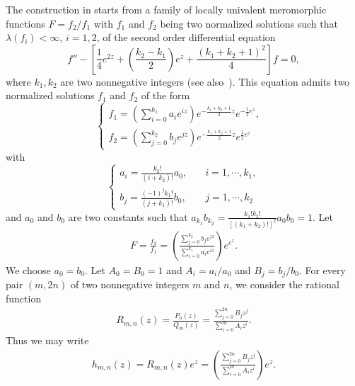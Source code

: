 \documentclass[12pt]{amsart}
\numberwithin{equation}{section}
\begin{document}
The construction in \cite{Zhang2024} starts from a family of locally univalent meromorphic functions $F=f_2/f_1$ with $f_1$ and $f_2$ being two normalized solutions such that $\lambda(f_i)<\infty$, $i=1,2$, of the second order differential equation
\begin{equation*}%
f''-\left[\frac{1}{4}e^{2z}+\left(\frac{k_2-k_1}{2}\right)e^{z}+\frac{(k_1+k_2+1)^2}{4}\right]f=0,
\end{equation*}
where $k_1,k_2$ are two nonnegative integers (see also~\cite{ChiangIsmail2006,zhang2021,zhang2021-1,Zhang2022}). This equation admits two normalized solutions $f_1$ and $f_2$ of the form
\begin{equation*}
\left\{
  \begin{array}{ll}
    f_1=\left(\sum_{i=0}^{k_1}a_ie^{iz}\right)e^{-\frac{k_1+k_2+1}{2}z}e^{-\frac{1}{2}e^{z}},       &\\
    f_2=\left(\sum_{j=0}^{k_2}b_je^{jz}\right)e^{-\frac{k_1+k_2+1}{2}z}e^{\frac{1}{2}e^{z}}
  \end{array}
\right.
\end{equation*}
with
\begin{equation*}
\left\{
  \begin{array}{ll}
    a_i=\frac{k_2!}{(i+k_2)!}a_0,       & \quad  i=1,\cdots,k_1,\\
    b_j=\frac{(-1)^jk_1!}{(j+k_1)!}b_0, & \quad  j=1,\cdots,k_2
  \end{array}
\right.
\end{equation*}
and $a_0$ and $b_0$ are two constants such that $a_{k_1}b_{k_2}=\frac{k_1!k_2!}{[(k_1+k_2)!]^2}a_0b_0=1$. Let
\begin{equation*}
\begin{split}
F=\frac{f_2}{f_1}=\left(\frac{\sum_{j=0}^{k_2}b_je^{jz}}{\sum_{i=0}^{k_1}a_ie^{iz}}\right)e^{e^{z}}.
\end{split}
\end{equation*}
We choose $a_0=b_0$. Let $A_0=B_0=1$ and $A_i=a_i/a_0$ and $B_j=b_j/b_0$. For every pair $(m,2n)$ of two nonnegative integers $m$ and $n$, we consider the rational function
\begin{equation}\label{recuree1pm8}
\begin{split}
R_{m,n}(z)=\frac{P_n(z)}{Q_m(z)}=\frac{\sum_{j=0}^{2n}B_jz^j}{\sum_{i=0}^{m}A_iz^i}.
\end{split}
\end{equation}
Thus we may write
\begin{equation*}
\begin{split}
h_{m,n}(z)=R_{m,n}(z)e^{z}=\left(\frac{\sum_{j=0}^{2n}B_jz^j}{\sum_{i=0}^{m}A_iz^i}\right)e^{z}.
\end{split}
\end{equation*}
\end{document}
